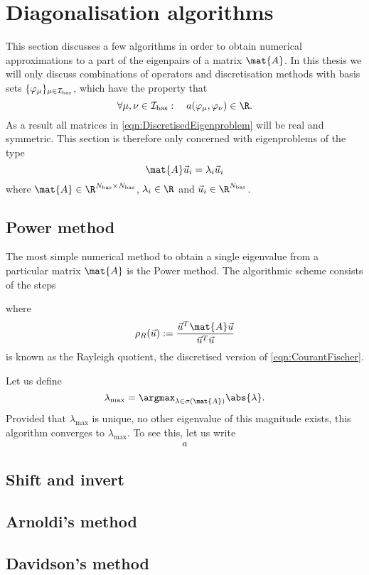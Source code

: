 \section{Diagonalisation algorithms}
\label{sec:DiagAlgos}

This section discusses a few algorithms in order to obtain
numerical approximations to a part of the eigenpairs of a matrix $\mat{A}$.
In this thesis we will only discuss combinations of operators
and discretisation methods with basis sets
$\{\varphi_\mu\}_{\mu \in \mathcal{I}_\text{bas}}$, which have the property that
\[ \forall \mu, \nu \in \Ibas: \quad a(\varphi_\mu, \varphi_\nu) \in \R. \]
As a result all matrices in \eqref{eqn:DiscretisedEigenproblem}
will be real and symmetric.
This section is therefore only concerned with eigenproblems of the type
\[ \mat{A} \vec{u}_i = \lambda_i \vec{u}_i \]
where $\mat{A} \in \R^{\Nbas \times \Nbas}$,
$\lambda_i \in \R$ and $\vec{u}_i \in \R^{\Nbas}$.

\subsection{Power method}
The most simple numerical method to obtain
a single eigenvalue from a particular matrix $\mat{A}$
is the Power method.
The algorithmic scheme consists of the steps


where
\[ \rho_R(\vec{u}) := \frac{\vec{u}^T \mat{A} \vec{u}}{\vec{u}^T \vec{u}} \]
is known as the Rayleigh quotient,
the discretised version of \eqref{eqn:CourantFischer}.

Let us define
\[ \lambda_\text{max} = \argmax_{\lambda \in \sigma(\mat{A})} \abs{\lambda}. \]
Provided that $\lambda_\text{max}$ is unique,
\ie no other eigenvalue of this magnitude exists,
this algorithm converges to $\lambda_\text{max}$.
To see this, let us write
\begin{align}
	a
\end{align}




\subsection{Shift and invert}

\subsection{Arnoldi's method}

\subsection{Davidson's method}
